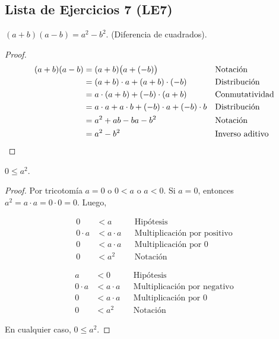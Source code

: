 \documentclass[11pt]{article}
\begin{document}
\subsection*{Lista de Ejercicios 7 (LE7)}

$(a+b)(a-b)=a^2-b^2$. (Diferencia de cuadrados).
\vspace{-1em}\begin{proof} 
    \begin{align*}
    (a+b)(a-b) &= (a+b)\bigl(a+(-b)\bigr) && \text{Notación}\\
    &= (a+b)\cdot a + (a+b)\cdot (-b) && \text{Distribución}\\
    &= a\cdot (a+b) + (-b)\cdot (a+b) && \text{Conmutatividad}\\
    &= a\cdot a + a\cdot b + (-b)\cdot a + (-b) \cdot b && \text{Distribución}\\
    &= a^2+ ab -ba -b^2 && \text{Notación}\\
    &=a^2-b^2 && \text{Inverso aditivo} \qedhere
    \end{align*}    
\end{proof} \vspace{-1em}

$0\leq a^2$.
    \vspace{-1em}\begin{proof} 
        Por tricotomía $a=0$ o $0<a$ o $a<0$. Si $a=0$, entonces $a^2=a\cdot a =0 \cdot 0 =0$. Luego,
        \begin{center}\vspace{-1em}
            \begin{minipage}[l]{.5\linewidth}
                \begin{align*}
                    0 &< a && \text{Hipótesis}\\
                    0 \cdot a &< a \cdot a && \text{Multiplicación por positivo}\\
                    0 &< a \cdot a && \text{Multiplicación por 0}\\
                    0 &< a^2 && \text{Notación}
                \end{align*}
            \end{minipage}%
            \begin{minipage}[r]{.5\linewidth}
                \begin{align*}
                    a &< 0 && \text{Hipótesis}\\
                    0 \cdot a &< a\cdot a && \text{Multiplicación por negativo}\\
                    0 &< a\cdot a && \text{Multiplicación por 0}\\
                    0 &< a^2 && \text{Notación}
                \end{align*}
            \end{minipage}
        \end{center} En cualquier caso, $0\leq a^2$.
    \end{proof} \vspace{-1em}
\end{document}

